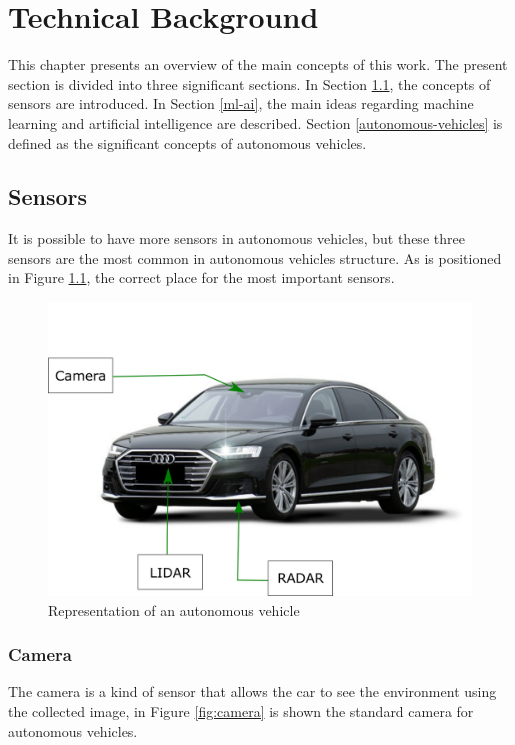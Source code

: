 \chapter{Technical Background}
\label{capitulo3}

This chapter presents an overview of the main concepts of this work. The present section is divided into three significant sections. In Section \ref{sensors}, the concepts of sensors are introduced. In Section \ref{ml-ai}, the main ideas regarding machine learning and artificial intelligence are described. Section \ref{autonomous-vehicles} is defined as the significant concepts of autonomous vehicles.

\section{Sensors}\label{sensors}

It is possible to have more sensors in autonomous vehicles, but these three sensors are the most common in autonomous vehicles structure. As is positioned in Figure \ref{fig:autonomous-vehicles}, the correct place for the most important sensors.


\begin{figure}[H]
\centering
\includegraphics[scale=0.7]{imagens/image823.png}
\caption{Representation of an autonomous vehicle}
\label{fig:autonomous-vehicles}
\end{figure}


\subsection{Camera}
The camera is a kind of sensor that allows the car to see the environment using the collected image, in Figure \ref{fig:camera} is shown the standard camera for autonomous vehicles.


